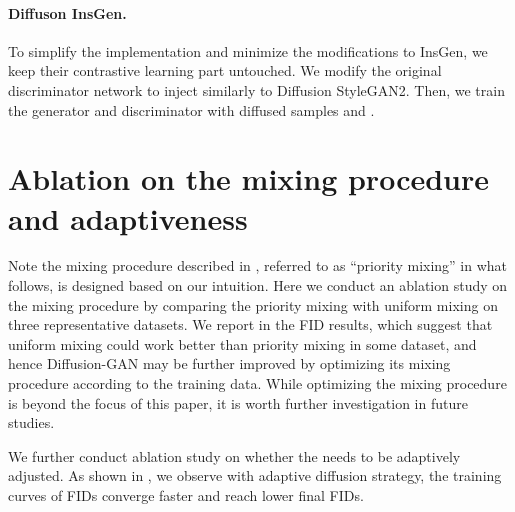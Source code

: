 \documentclass{article} \usepackage{iclr2023_conference,times}
\theoremstyle{plain}
\theoremstyle{definition}
\theoremstyle{remark}
\begin{document}
\paragraph{Diffuson InsGen. } To simplify the implementation and minimize the modifications to InsGen, we keep their contrastive learning part untouched. We modify the original discriminator network to inject  similarly to Diffusion StyleGAN2. Then, we train the generator and discriminator with diffused samples  and .

 

\section{Ablation on the mixing procedure and  adaptiveness}

Note the mixing procedure described in , referred to as ``priority mixing'' in what follows, is designed based on our intuition. Here we conduct an ablation study on the mixing procedure by comparing the priority mixing with uniform mixing on three representative datasets. We report in  the FID results, which suggest that uniform mixing could work better than priority mixing in some dataset, and hence Diffusion-GAN may be further improved by optimizing its mixing procedure according to the training data. While optimizing the mixing procedure is beyond the focus of this paper, it is worth further investigation in future studies.


\begin{table}[H]
 \caption{ Ablation study on the mixing procedure. ``Priority Mixing'' refers to the mixing procedure in  and ``Uniform Mixing'' refers to sample  uniformly at random. }
    \label{tab:mixing_ablation}
    \centering
\end{table}

{We further conduct ablation study on whether the  needs to be adaptively adjusted. As shown in , we observe with adaptive diffusion strategy, the training curves of FIDs converge faster and reach lower final FIDs. }
\end{document}
